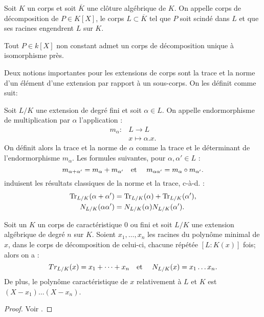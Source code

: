 \documentclass[a4paper]{article} %
\numberwithin{section}{part}
\numberwithin{equation}{section}
\newcommand\etmath{\textup{\quad et \quad}}
\begin{document}
\begin{defn}
\label{def:dec}
Soit $K$ un corps et soit $\overline{K}$ une clôture algébrique de $K$. On 
appelle corps de décomposition de $P\in K[X]$, le corps $L\subset\overline{K}$ 
tel que $P$ soit scindé dans $L$ et que ses racines engendrent $L$ sur $K$.
\end{defn}

\begin{thm}
\label{cor:dec}
Tout $P\in k[X]$ non constant admet un corps de décomposition unique à 
isomorphisme près.
\end{thm}




Deux notions importantes pour les extensions de corps sont la trace et la norme
d'un élément d'une extension par rapport à un sous-corps. On les définit comme
suit:

\begin{defn}
Soit $L/K$ une extension de degré fini et soit $\alpha\in L$. On appelle
endormorphisme de multiplication par $\alpha$ l'application :
\begin{align*}
m_{\alpha} :&L \longrightarrow L\\
&x\longmapsto\alpha.x.
\end{align*}
On définit alors la trace et la norme de $\alpha$ comme la trace et le 
déterminant de l'endormorphisme $m_{\alpha}$. Les formules suivantes, pour 
$\alpha, \alpha'\in L$ :
\begin{equation}
m_{\alpha + \alpha'} = m_{\alpha} + m_{\alpha'} \etmath
m_{\alpha\alpha'} = m_{\alpha}\circ m_{\alpha'}. 
\end{equation}
induisent les résultats classiques de la norme et la trace, c-à-d. :
\begin{align}
\textup{Tr}_{L/K}(\alpha + \alpha') &= \textup{Tr}_{L/K}(\alpha) +
\textup{Tr}_{L/K}(\alpha'),\\
N_{L/K}(\alpha\alpha') &= N_{L/K}(\alpha)N_{L/K}(\alpha').
\end{align}
\end{defn}

\begin{prop}
Soit un $K$ un corps de caractéristique 0 ou fini et soit $L/K$ une extension
algébrique de degré $n$ sur $K$. Soient $x_1,\dots, x_n$ les racines du polynôme
minimal de $x$, dans le corps de décomposition de celui-ci, chacune répétée 
$[L:K(x)]$ fois; alors on a :
\begin{equation}
Tr_{L/K}(x) = x_1 + \dots + x_n \etmath N_{L/K}(x) = x_1\dots x_n.
\end{equation}
De plus, le polynôme caractéristique de $x$ relativement à $L$ et $K$ est $(X -
x_1)\dots(X - x_n)$.
\end{prop}
\begin{proof}
Voir \cite[p. 44, prop. 1]{Sam}.
\end{proof}
\end{document}
